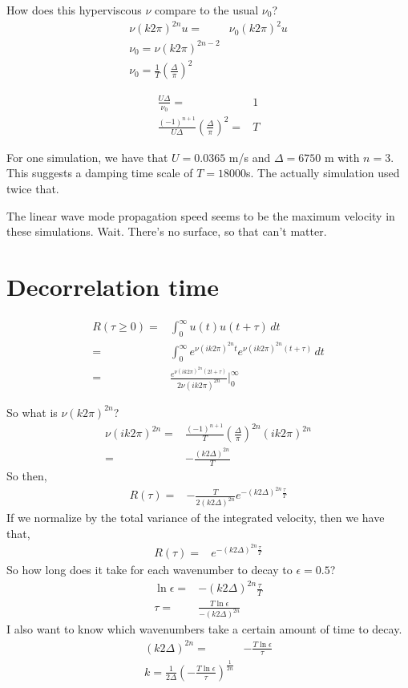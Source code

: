 \documentclass[11pt, oneside]{article}   	%
\begin{document}
How does this hyperviscous $\nu$ compare to the usual $\nu_0$?
\begin{align}
\nu (k 2 \pi)^{2n} u =& \nu_0 (k 2 \pi)^{2} u \\
\nu_0 = \nu (k 2 \pi)^{2n-2}  \\
\nu_0 = \frac{1}{T} \left( \frac{\Delta}{\pi} \right)^{2}
\end{align}

\begin{align}
 \frac{U \Delta}{\nu_0} =& 1\\
\frac{(-1)^{n+1}}{U \Delta} \left( \frac{\Delta}{\pi} \right)^{2} =& T
\end{align}

For one simulation, we have that $U = 0.0365$ m/s and $\Delta=6750$ m with $n=3$. This suggests a damping time scale of $T=18000$s. The actually simulation used twice that.

The linear wave mode propagation speed seems to be the maximum velocity in these simulations. Wait. There's no surface, so that can't matter.

%
\section{Decorrelation time}
%

\begin{align}
R(\tau \geq 0) =& \int_0^\infty u(t)u(t+\tau) \, dt \\
=& \int_0^\infty e^{\nu (i k 2 \pi)^{2n} t} e^{\nu (i k 2 \pi)^{2n} (t + \tau) } \, dt \\
=& \frac{e^{ \nu (i k 2 \pi)^{2n} (2t + \tau)}}{2 \nu (i k 2 \pi)^{2n}} \biggr\rvert_0^\infty
\end{align}

So what is $\nu (k 2 \pi)^{2n}$?
\begin{align}
\nu (i k 2 \pi)^{2n} =&  \frac{(-1)^{n+1}}{T} \left( \frac{\Delta}{\pi} \right)^{2n}(i k 2 \pi)^{2n} \\
=& - \frac{(k 2 \Delta)^{2n}}{T} 
\end{align}
So then,
\begin{align}
R(\tau) =&- \frac{T} {2(k 2 \Delta)^{2n}} e^{ - (k 2 \Delta)^{2n}\frac{\tau}{T}} 
\end{align}
If we normalize by the total variance of the integrated velocity, then we have that,
\begin{align}
R(\tau) =& e^{ - (k 2 \Delta)^{2n}\frac{\tau}{T}} 
\end{align}
So how long does it take for each wavenumber to decay to $\epsilon=0.5$?
\begin{align}
\ln \epsilon =& - (k 2 \Delta)^{2n}\frac{\tau}{T} \\
\tau =& \frac{T \ln \epsilon}{- (k 2 \Delta)^{2n}}
\end{align}
I also want to know which wavenumbers take a certain amount of time to decay.
\begin{align}
(k 2 \Delta)^{2n} =& -\frac{T \ln \epsilon}{ \tau} \\
k = \frac{1}{2 \Delta} \left( -\frac{T \ln \epsilon}{ \tau} \right)^{\frac{1}{2n}}
\end{align}
\end{document}
